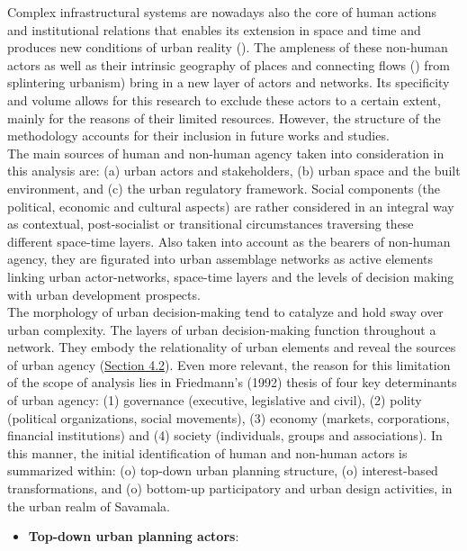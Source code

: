 \documentclass[11pt]{report}
\begin{document}
{{{{Complex infrastructural systems are nowadays also the core of human actions and institutional relations that enables its extension in space and time and produces new conditions of urban reality (\href{Graham}{\citealt{graham_splintering_2001}}).
The ampleness of these non-human actors as well as their intrinsic geography of places and connecting flows (\href{Swyngedouw}{\citealt{swyngedouw_communication_1993}}) from splintering urbanism) bring in a new layer of actors and networks. Its specificity and volume allows for this research to exclude these actors to a certain extent, mainly for the reasons of their limited resources. However, the structure of the methodology accounts for their inclusion in future works and studies.
\\

The main sources of human and non-human agency taken into consideration in this analysis are: (a) urban actors and stakeholders, (b) urban space and the built environment, and (c) the urban regulatory framework. Social components (the political, economic and cultural aspects) are rather considered in an integral way as contextual, post-socialist or transitional circumstances traversing these different space-time layers. Also taken into account as the bearers of non-human agency, they are figurated into urban assemblage networks as active elements linking urban actor-networks, space-time layers and the levels of decision making with urban development prospects.
\\

The morphology of urban decision-making tend to catalyze and hold sway over urban complexity. The layers of urban decision-making function throughout a network. They embody the relationality of urban elements and reveal the sources of urban agency (\href{Section 4.2}{Section 4.2}).
Even more relevant, the reason for this limitation of the scope of analysis lies in Friedmann's (1992) thesis of four key determinants of urban agency:
(1) governance (executive, legislative and civil),
(2) polity (political organizations, social movements),
(3) economy (markets, corporations, financial institutions) and
(4) society (individuals, groups and associations).
In this manner, the initial identification of human and non-human actors is summarized within:
(o) top-down urban planning structure,
(o) interest-based transformations,
and
(o) bottom-up participatory and urban design activities, in the urban realm of Savamala.

\begin{itemize}
\item \textbf{Top-down urban planning actors}:


\end{itemize}}}}}
\end{document}
